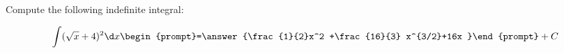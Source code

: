 \documentclass{ximera}
\author{Jim Talamo}
\begin{document}
\begin{exercise}
Compute the following indefinite integral:

\[
\int (\sqrt{x}+4)^2  \d x 
\begin{prompt}=\answer{\frac{1}{2}x^2 +\frac{16}{3} x^{3/2}+16x }\end{prompt}+C
\]
\end{exercise}
\end{document}
